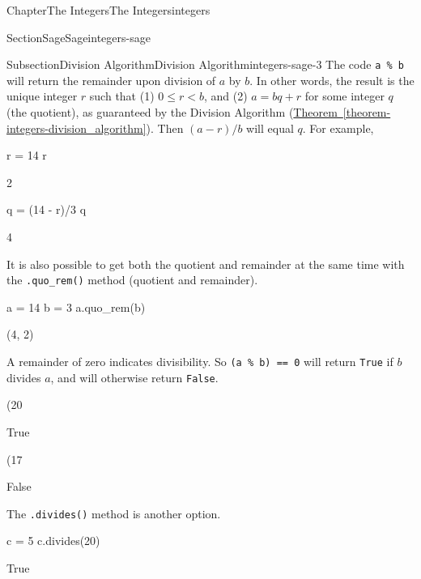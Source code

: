 \documentclass[oneside,10pt,]{book}
\newcommand{\xreffont}{\relax}
\newcommand{\mono}[1]{\texttt{#1}}
\numberwithin{equation}{section}
\newcommand{\lt}{<}
\begin{document}
\begin{chapterptx}{Chapter}{The Integers}{}{The Integers}{}{}{integers}
\begin{sectionptx}{Section}{Sage}{}{Sage}{}{}{integers-sage}
\begin{introduction}{}
\end{introduction}%
%
%
\typeout{************************************************}
\typeout{************************************************}
%
\begin{subsectionptx}{Subsection}{Division Algorithm}{}{Division Algorithm}{}{}{integers-sage-3}
The code \mono{a \% b} will return the remainder upon division of \(a\) by \(b\).  In other words, the result is the unique integer \(r\) such that (1) \(0\leq r\lt b\), and (2) \(a=bq+r\) for some integer \(q\) (the quotient), as guaranteed by the Division Algorithm (\hyperref[theorem-integers-division_algorithm]{Theorem~{\xreffont\ref{theorem-integers-division_algorithm}}}).  Then \((a-r)/b\) will equal \(q\).  For example,%
\begin{sageinput}
r = 14 %
r
\end{sageinput}
\begin{sageoutput}
2
\end{sageoutput}
\begin{sageinput}
q = (14 - r)/3
q
\end{sageinput}
\begin{sageoutput}
4
\end{sageoutput}
It is also possible to get both the quotient and remainder at the same time with the \mono{.quo\_rem()} method (quotient and remainder).%
\begin{sageinput}
a = 14
b = 3
a.quo_rem(b)
\end{sageinput}
\begin{sageoutput}
(4, 2)
\end{sageoutput}
A remainder of zero indicates divisibility.  So \mono{(a \% b) == 0} will return \mono{True} if \(b\) divides \(a\), and will otherwise return \mono{False}.%
\begin{sageinput}
(20 %
\end{sageinput}
\begin{sageoutput}
True
\end{sageoutput}
\begin{sageinput}
(17 %
\end{sageinput}
\begin{sageoutput}
False
\end{sageoutput}
The \mono{.divides()} method is another option.%
\begin{sageinput}
c = 5
c.divides(20)
\end{sageinput}
\begin{sageoutput}
True
\end{sageoutput}

\end{subsectionptx}
\end{sectionptx}
\end{chapterptx}
\end{document}
